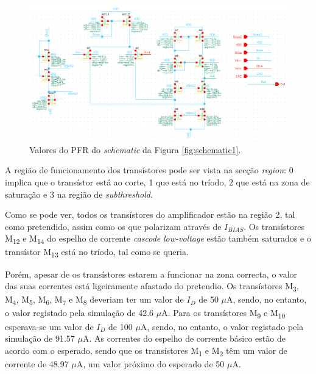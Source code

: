 \documentclass[11pt]{article}
\numberwithin{equation}{section}
\begin{document}
\begin{figure}[H]
	\centering
	\includegraphics[keepaspectratio=true, scale=0.85]{exps/PFRoriginaisVTH}
	\vspace{-0.5em}
	\caption{Valores do PFR do \textit{schematic} da Figura \ref{fig:schematic1}.}
	\label{fig:PFR1}
	\vspace{-0.8em}
\end{figure} 

A região de funcionamento dos transístores pode ser vista na secção \textit{region}: 0 implica que o transístor está ao corte, 1 que está no tríodo, 2 que está na zona de saturação e 3 na região de \textit{subthreshold}.

Como se pode ver, todos os transístores do amplificador estão na região 2, tal como pretendido, assim como os que polarizam através de $I_{BIAS}$. Os transístores M\textsubscript{12} e M\textsubscript{14} do espelho de corrente \textit{cascode} \textit{low-voltage} estão também saturados e o transístor M\textsubscript{13} está no tríodo, tal como se queria.

Porém, apesar de os transístores estarem a funcionar na zona correcta, o valor das suas correntes está ligeiramente afastado do pretendio. Os transístores M\textsubscript{3}, M\textsubscript{4}, M\textsubscript{5}, M\textsubscript{6}, M\textsubscript{7} e M\textsubscript{8} deveriam ter um valor de $I_D$ de 50 $\mu$A, sendo, no entanto, o valor registado pela simulação de 42.6 $\mu$A. Para os transístores M\textsubscript{9} e M\textsubscript{10} esperava-se um valor de $I_D$ de 100 $\mu$A, sendo, no entanto, o valor registado pela simulação de 91.57 $\mu$A. As correntes do espelho de corrente básico estão de acordo com o esperado, sendo que os transístores M\textsubscript{1} e M\textsubscript{2} têm um valor de corrente de 48.97 $\mu$A, um valor próximo do esperado de 50 $\mu$A.
\end{document}
